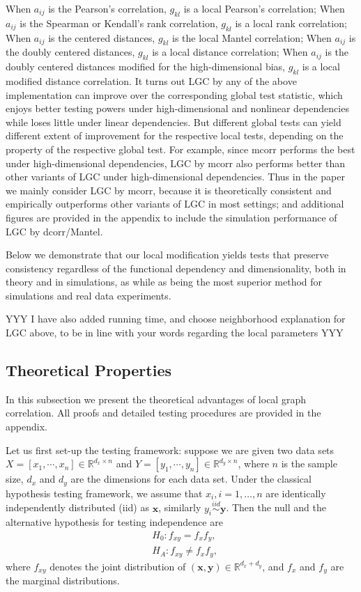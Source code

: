 \documentclass[11pt]{article}
\providecommand{\mb}[1]{\boldsymbol{#1}}
\newcommand{\Real}{\mathbb{R}}
\begin{document}
When $a_{ij}$ is the Pearson's correlation, $g_{kl}$ is a local Pearson's correlation;
When $a_{ij}$ is the Spearman or Kendall's rank correlation, $g_{kl}$ is a local rank correlation;
When $a_{ij}$ is the centered distances, $g_{kl}$ is the local Mantel correlation;
When $a_{ij}$ is the doubly centered distances, $g_{kl}$ is a local distance correlation;
When $a_{ij}$ is the doubly centered distances modified for the high-dimensional bias, $g_{kl}$ is a local modified distance correlation.  
It turns out LGC by any of the above implementation can improve over the corresponding global test statistic, which enjoys better testing powers under high-dimensional and nonlinear dependencies while loses little under linear dependencies. But different global tests can yield different extent of improvement for the respective local tests, depending on the property of the respective global test. For example, since mcorr performs the best under high-dimensional dependencies, LGC by mcorr also performs better than other variants of LGC under high-dimensional dependencies. Thus in the paper we mainly consider LGC by mcorr, because it is theoretically consistent and empirically outperforms other variants of LGC in most settings; and additional figures are provided in the appendix to include the simulation performance of LGC by dcorr/Mantel. 

Below we demonstrate that our local modification yields tests that preserve consistency regardless of the functional dependency and dimensionality, both in theory and in simulations, as while as being the most superior method for simulations and real data experiments.

YYY I have also added running time, and choose neighborhood explanation for LGC above, to be in line with your words regarding the local parameters YYY

\subsection{Theoretical Properties}
\label{main4}
In this subsection we present the theoretical advantages of local graph correlation. All proofs and detailed testing procedures are provided in the appendix. 

Let us first set-up the testing framework: suppose we are given two data sets $X=[x_{1},\cdots, x_{n}] \in \Real^{d_{x} \times n}$ and $Y=[y_{1},\cdots, y_{n}] \in \Real^{d_{y} \times n}$, where $n$ is the sample size, $d_{x}$ and $d_{y}$ are the dimensions for each data set. Under the classical hypothesis testing framework, we assume that $x_{i}, i=1,\ldots,n$ are identically independently distributed (iid) as $\mb{x}$, similarly $y_{i} \stackrel{iid}{\sim} \mb{y}$. Then the null and the alternative hypothesis for testing independence are
\begin{align*}
& H_{0}: f_{xy}=f_{x}f_{y},\\
& H_{A}: f_{xy} \neq f_{x}f_{y},
\end{align*}
where $f_{xy}$ denotes the joint distribution of $(\mb{x},\mb{y}) \in \Real^{d_{x} + d_{y}}$, and $f_{x}$ and $f_{y}$ are the marginal distributions. 
\end{document}
